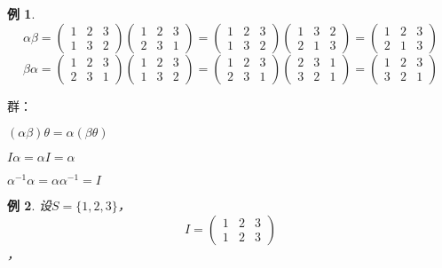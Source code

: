 \documentclass{article}
\newtheorem*{Example}{例}
\begin{document}
\begin{CJK*}{UTF8}{gbsn}
  \begin{Example}
    \[\alpha\beta=\begin{pmatrix}1&2&3\\1&3&2\end{pmatrix}\begin{pmatrix}1&2&3\\2&3&1\end{pmatrix}=\begin{pmatrix}1&2&3\\1&3&2\end{pmatrix}\begin{pmatrix}1&3&2\\2&1&3\end{pmatrix}=\begin{pmatrix}1&2&3\\2&1&3\end{pmatrix}\]
            \[\beta\alpha=\begin{pmatrix}1&2&3\\2&3&1\end{pmatrix}\begin{pmatrix}1&2&3\\1&3&2\end{pmatrix}=\begin{pmatrix}1&2&3\\2&3&1\end{pmatrix}\begin{pmatrix}2&3&1\\3&2&1\end{pmatrix}=\begin{pmatrix}1&2&3\\3&2&1\end{pmatrix}\]

      \end{Example}

      

      群：
      
      $(\alpha \beta) \theta = \alpha (\beta \theta)$

      $I\alpha = \alpha I = \alpha$

      $\alpha^{-1}\alpha = \alpha \alpha^{-1} = I$
      
        \begin{Example}
    设$S=\{1,2,3\}$，
    \[I=\begin{pmatrix}1&2&3\\1&2&3\end{pmatrix}\]，    
  \end{Example}



\end{CJK*}
\end{document}
